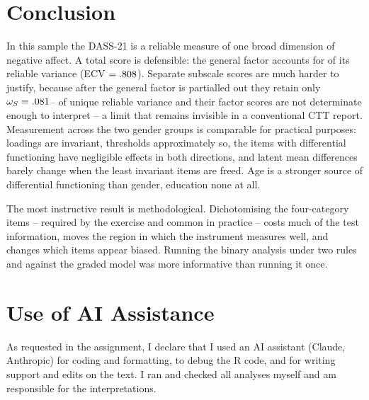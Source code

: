 \documentclass[11pt,a4paper]{article}
\begin{document}
\section{Conclusion}\label{sec:conclusion}

In this sample the DASS-21 is a reliable measure of one broad dimension of negative
affect. A total score is defensible: the general factor accounts for \OmegaRatio{} of its
reliable variance (ECV $=.808$). Separate subscale scores are much harder to justify,
because after the general factor is partialled out they retain only
$\omega_S=.081$--\OmegaSAnxiety{} of unique reliable variance and their factor
scores are not determinate enough to interpret -- a limit that remains invisible in a
conventional CTT report. Measurement across the two gender groups is comparable for
practical purposes: loadings are invariant, thresholds approximately so, the items with
differential functioning have negligible effects in both directions, and latent mean
differences barely change when the least invariant items are freed. Age is a stronger
source of differential functioning than gender, education none at all.

The most instructive result is methodological. Dichotomising the four-category items --
required by the exercise and common in practice -- costs much of the test information,
moves the region in which the instrument measures well, and changes which items appear
biased. Running the binary analysis under two rules and against the graded model was
more informative than running it once.

\section*{Use of AI Assistance}

As requested in the assignment, I declare that I used an AI assistant (Claude,
Anthropic) for coding and formatting, to debug the R code, and for writing support and
edits on the text. I ran and checked all analyses myself and am responsible for the
interpretations.

\printbibliography[heading=bibnumbered,title={References}]
\end{document}
